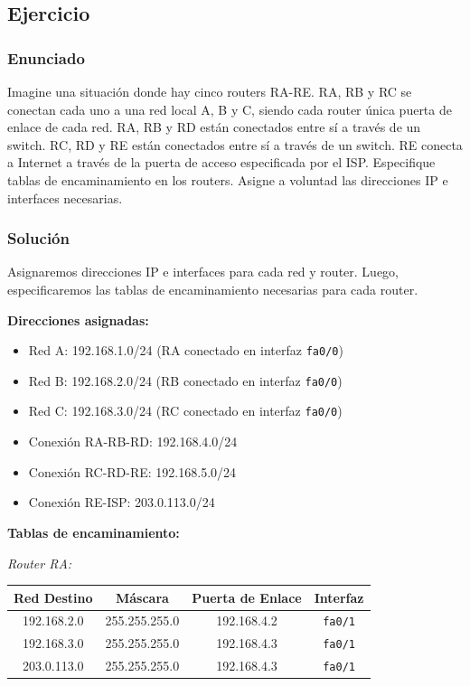 \documentclass[a4paper,12pt]{article}
\begin{document}
\subsection*{Ejercicio}

\subsubsection*{Enunciado}

Imagine una situación donde hay cinco routers RA-RE. RA, RB y RC se conectan cada uno a una red local A, B y C, siendo cada router única puerta de enlace de cada red. RA, RB y RD están conectados entre sí a través de un switch. RC, RD y RE están conectados entre sí a través de un switch. RE conecta a Internet a través de la puerta de acceso especificada por el ISP. Especifique tablas de encaminamiento en los routers. Asigne a voluntad las direcciones IP e interfaces necesarias.

\subsubsection*{Solución}

Asignaremos direcciones IP e interfaces para cada red y router. Luego, especificaremos las tablas de encaminamiento necesarias para cada router.

\textbf{Direcciones asignadas:}
\begin{itemize}
    \item Red A: 192.168.1.0/24 (RA conectado en interfaz \texttt{fa0/0})
    \item Red B: 192.168.2.0/24 (RB conectado en interfaz \texttt{fa0/0})
    \item Red C: 192.168.3.0/24 (RC conectado en interfaz \texttt{fa0/0})
    \item Conexión RA-RB-RD: 192.168.4.0/24
    \item Conexión RC-RD-RE: 192.168.5.0/24
    \item Conexión RE-ISP: 203.0.113.0/24
\end{itemize}

\textbf{Tablas de encaminamiento:}

\textit{Router RA:}
\begin{tabular}{|c|c|c|c|}
\hline
Red Destino & Máscara & Puerta de Enlace & Interfaz \\
\hline
192.168.2.0 & 255.255.255.0 & 192.168.4.2 & \texttt{fa0/1} \\
192.168.3.0 & 255.255.255.0 & 192.168.4.3 & \texttt{fa0/1} \\
203.0.113.0 & 255.255.255.0 & 192.168.4.3 & \texttt{fa0/1} \\
\hline
\end{tabular}
\end{document}
